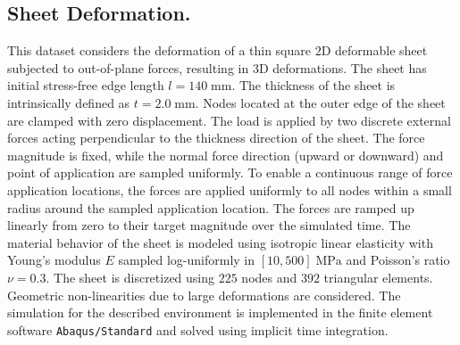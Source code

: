 %
\subsection{Sheet Deformation.}
%
%
This dataset considers the deformation of a thin square $2$D deformable sheet subjected to out-of-plane forces, resulting in $3$D deformations.
%
The sheet has initial stress-free edge length $l=140\;\text{mm}$. 
%
The thickness of the sheet is intrinsically defined as $t = 2.0 \;\text{mm}$. 
%
Nodes located at the outer edge of the sheet are clamped with zero displacement. The load is applied by two discrete external forces acting perpendicular to the thickness direction of the sheet. 
%
The force magnitude is fixed, while the normal force direction (upward or downward) and point of application are sampled uniformly.
%
To enable a continuous range of force application locations, the forces are applied uniformly to all nodes within a small radius  around the sampled application location. 
%
The forces are ramped up linearly from zero to their target magnitude over the simulated time. 
%
The material behavior of the sheet is modeled using isotropic linear elasticity with Young's modulus $E$ sampled log-uniformly in $[10, 500] \; \text{MPa}$ and Poisson's ratio $\nu{=}0.3$. 
%
The sheet is discretized using $225$ nodes and $392$ triangular elements. 
%
Geometric non-linearities due to large deformations are considered.
%
The simulation for the described environment is implemented in the finite element software \texttt{Abaqus/Standard} and solved using implicit time integration.
%
